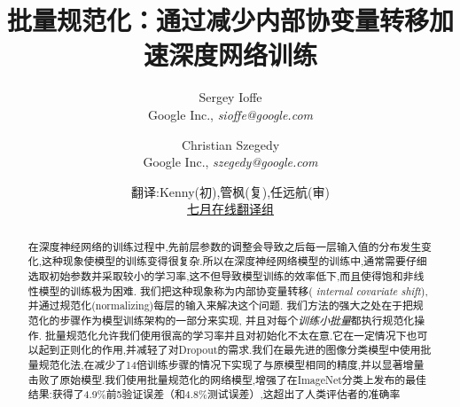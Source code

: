 \documentclass[twocolumn]{article}
\begin{document}
\newcommand{\jac}[2]{\frac{\partial #1}{\partial #2}}
\newcommand{\xhat}{\widehat{x}}
\newcommand{\yhat}{\widehat{y}}
\newcommand{\zhat}{\widehat{z}}
\newcommand{\vxhat}{\widehat\mathrm{x}}
\newcommand{\vzhat}{\widehat\mathrm{z}}
\newcommand{\setX}{\mathcal{X}}
\newcommand{\setB}{\mathcal{B}}
\newcommand{\E}{\text{E}}
\newcommand{\Var}{\text{Var}}
\newcommand{\Cov}{\text{Cov}}
\newcommand{\Fhat}{\widehat{F}}
\newcommand{\Thetahat}{\widehat{\Theta}}
\newcommand{\Norm}{\text{Norm}}
\newcommand{\BatchNorm}{\text{BN}}
\newcommand{\kk}{{(k)}}
\newcommand{\vx}{\mathrm{x}}
\newcommand{\vy}{\mathrm{y}}
\newcommand{\vz}{\mathrm{z}}
\newcommand{\vb}{\mathrm{b}}
\newcommand{\vu}{\mathrm{u}}
\newcommand{\comt}{// }
\renewcommand{\algorithmiccomment}[1]{\comt #1}
\newcommand{\BN}[2]{\text{BN}_{#2}(#1)}
\renewcommand{\algorithmicrequire}{\textbf{Input:}}
\renewcommand{\algorithmicensure}{\textbf{Output:}}
\newcommand{\mils}{\cdot 10^6}
\newcommand{\netw}[1]{{\sl #1}}
\newcommand{\norig}{\text{\sl N}}
\newcommand{\ntrain}{\norig_\mathrm{BN}^\mathrm{tr}}
\newcommand{\ninf}{\norig_\mathrm{BN}^\mathrm{inf}}
\renewcommand{\cite}[1]{\citep{#1}}

\title{批量规范化：通过减少内部协变量转移加速深度网络训练}

\author{Sergey Ioffe \\Google Inc., {\sl sioffe@google.com} \and
Christian Szegedy \\Google Inc., {\sl szegedy@google.com} \and 翻译:Kenny(初),管枫(复),任远航(审)\\
\href{https://github.com/JulyEdu-PaperTranslation/DeepLearning}{七月在线翻译组}
}

\date{}

\maketitle

\begin{abstract}

在深度神经网络的训练过程中,先前层参数的调整会导致之后每一层输入值的分布发生变化,这种现象使模型的训练变得很复杂.所以在深度神经网络模型的训练中,通常需要仔细选取初始参数并采取较小的学习率,这不但导致模型训练的效率低下,而且使得饱和非线性模型的训练极为困难. 我们把这种现象称为内部协变量转移({\em
  internal covariate shift}),并通过规范化(normalizing)每层的输入来解决这个问题.  
我们方法的强大之处在于把规范化的步骤作为模型训练架构的一部分来实现, 并且对每个{\em 训练小批量}都执行规范化操作.
批量规范化允许我们使用很高的学习率并且对初始化不太在意.它在一定情况下也可以起到正则化的作用,并减轻了对Dropout的需求.我们在最先进的图像分类模型中使用批量规范化法,在减少了14倍训练步骤的情况下实现了与原模型相同的精度,并以显著增量击败了原始模型.我们使用批量规范化的网络模型,增强了在ImageNet分类上发布的最佳结果:获得了4.9\%前5验证误差（和4.8\%测试误差）,这超出了人类评估者的准确率
\end{abstract}
\end{document}
